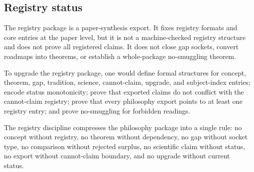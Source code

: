 \subsection{Registry status}
\label{subsec:philosophy-registry-status}

\begin{definition}
\label{def:philosophy-registry-package-status}
The registry package is a paper-synthesis export. It fixes registry
formats and core entries at the paper level, but it is not a
machine-checked registry structure and does not prove all registered
claims. It does not close gap sockets, convert roadmaps into theorems,
or establish a whole-package no-smuggling theorem.
\end{definition}

\begin{definition}
\label{def:philosophy-registry-package-upgrade}
To upgrade the registry package, one would define formal structures for
concept, theorem, gap, tradition, science, cannot-claim, upgrade, and
subject-index entries; encode status monotonicity; prove that exported
claims do not conflict with the cannot-claim registry; prove that every
philosophy export points to at least one registry entry; and prove
no-smuggling for forbidden readings.
\end{definition}

\begin{definition}
\label{def:philosophy-registry-compression}
The registry discipline compresses the philosophy package into a
single rule: no concept without registry, no theorem without
dependency, no gap without socket type, no comparison without rejected
surplus, no scientific claim without status, no export without
cannot-claim boundary, and no upgrade without current status.
\end{definition}
